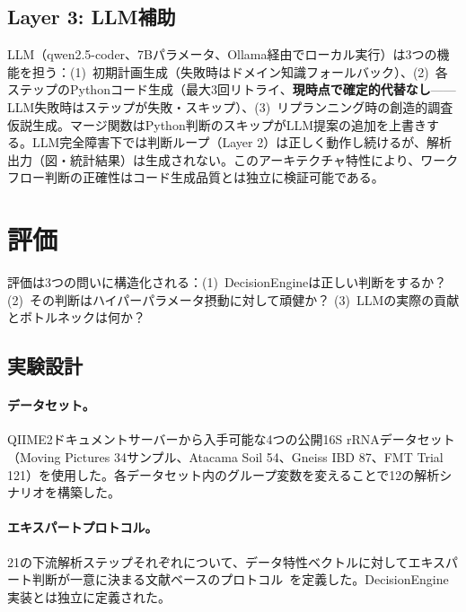 \documentclass[11pt,a4paper]{article}
\begin{document}
\subsection{Layer 3: LLM補助}

LLM（qwen2.5-coder、7Bパラメータ、Ollama経由でローカル実行）は3つの機能を担う：(1)~初期計画生成（失敗時はドメイン知識フォールバック）、(2)~各ステップのPythonコード生成（最大3回リトライ、\textbf{現時点で確定的代替なし}——LLM失敗時はステップが失敗・スキップ）、(3)~リプランニング時の創造的調査仮説生成。マージ関数はPython判断のスキップがLLM提案の追加を上書きする。LLM完全障害下では判断ループ（Layer 2）は正しく動作し続けるが、解析出力（図・統計結果）は生成されない。このアーキテクチャ特性により、ワークフロー判断の正確性はコード生成品質とは独立に検証可能である。

\section{評価}
\label{sec:eval}

評価は3つの問いに構造化される：(1)~DecisionEngineは正しい判断をするか？ (2)~その判断はハイパーパラメータ摂動に対して頑健か？ (3)~LLMの実際の貢献とボトルネックは何か？

\subsection{実験設計}
\label{sec:eval-setup}

\paragraph{データセット。}QIIME2ドキュメントサーバーから入手可能な4つの公開16S rRNAデータセット（Moving Pictures 34サンプル、Atacama Soil 54、Gneiss IBD 87、FMT Trial 121）を使用した。各データセット内のグループ変数を変えることで12の解析シナリオを構築した。

\paragraph{エキスパートプロトコル。}21の下流解析ステップそれぞれについて、データ特性ベクトルに対してエキスパート判断が一意に決まる文献ベースのプロトコル~\citep{anderson2001,willis2019,gloor2017,mcmurdie2014}を定義した。DecisionEngine実装とは独立に定義された。
\end{document}
